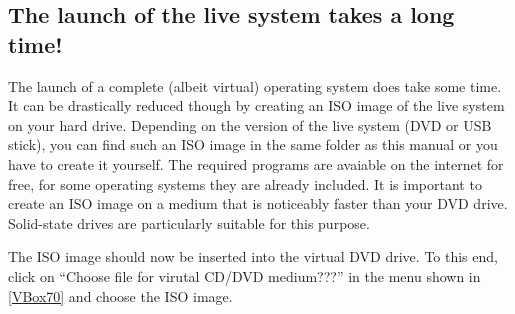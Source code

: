 \documentclass[a4paper,10pt,BCOR=0mm,DIV=14]{scrartcl}
\newcommand{\command}[1]{\textsf{\enquote{#1}}}
\begin{document}
\subsection{The launch of the live system takes a long time!}
The launch of a complete (albeit virtual) operating system does take some time. It can be drastically reduced though by creating an ISO image of the live system on your hard drive. Depending on the version of the live system (DVD or USB stick), you can find such an ISO image in the same folder as this manual or you have to create it yourself. The required programs are avaiable on the internet for free, for some operating systems they are already included. It is important to create an ISO image on a medium that is noticeably faster than your DVD drive. Solid-state drives are particularly suitable for this purpose. 

The ISO image should now be inserted into the virtual DVD drive. To this end, click on \command{Choose file for virutal CD/DVD medium???} in the menu shown in \cref{VBox70} and choose the ISO image. 
\end{document}
